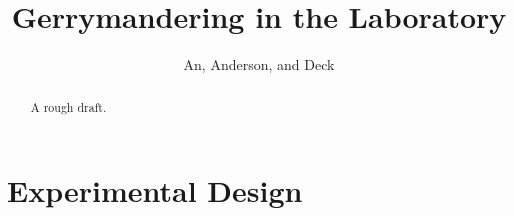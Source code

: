 \documentclass[AER]{AEA}
\begin{document}
\title{Gerrymandering in the Laboratory}
\author{An,  Anderson, and Deck}

\begin{abstract}
A rough draft.
\end{abstract}


\maketitle


\section{Experimental Design}
\label{section:experimental_design}
\end{document}
